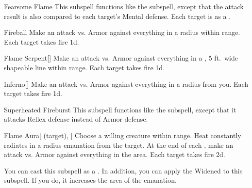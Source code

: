 \begin{ability}[\nth{3}]{Fearsome Flame}
This subspell functions like the  subspell, except that the attack result is also compared to each target's Mental defense.
\hit Each target is  as a .
\end{ability}
\vspace{0.25em}


\begin{ability}[\nth{3}]{Fireball}
Make an attack vs. Armor against everything in a \areamed radius within \rngmed range.
\hit Each target takes fire  \minus1d.
\end{ability}
\vspace{0.25em}


\begin{ability}[\nth{3}]{Flame Serpent}[]
Make an attack vs. Armor against everything in a \arealarge, 5 ft.\ wide shapeable line within \rngmed range.
\hit Each target takes fire  \minus1d.
\end{ability}
\vspace{0.25em}


\begin{ability}[\nth{3}]{Inferno}[]
Make an attack vs. Armor against everything in a \arealarge radius from you.
\hit Each target takes fire  \minus1d.
\end{ability}
\vspace{0.25em}


\begin{ability}[\nth{3}]{Superheated Fireburst}
This subspell functions like the  subspell, except that it attacks Reflex defense instead of Armor defense.
\end{ability}
\vspace{0.25em}


\begin{ability}[\nth{4}]{Flame Aura}[ (target), ]
Choose a willing creature within \rngclose range.
Heat constantly radiates in a \areamed radius emanation from the target.
At the end of each , make an attack vs. Armor against everything in the area.
\hit Each target takes fire  \minus2d.

You can cast this subspell as a .
In addition, you can apply the Widened  to this subspell.
If you do, it increases the area of the emanation.
\end{ability}
\vspace{0.25em}


